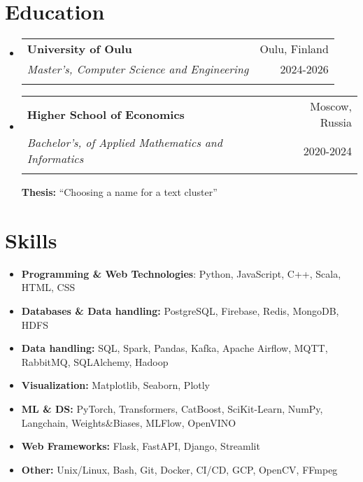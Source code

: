 \documentclass[letterpaper,10pt,dvipsnames]{article}
\makeatletter
\newcommand{\resumeEduSubheading}[5]{
  \item
    \vspace{2pt}\begin{tabular*}{0.97\textwidth}{l@{\extracolsep{\fill}}r}
      \large\textbf{#1} & #2 \\
      \textit{#3} & #4\\\\
    \end{tabular*}\vspace{-7pt}
}
\newcommand{\resumeSubHeadingListStart}{\begin{itemize}[leftmargin=*]}
\newcommand{\resumeSubHeadingListEnd}{\end{itemize}}
\newcommand{\resumeDesc}[1]{\begin{adjustwidth}{5pt}{0pt}\vspace{-2pt}{\small{#1}}\end{adjustwidth}}
\makeatother
\begin{document}
\section{Education}
\resumeSubHeadingListStart
  \resumeEduSubheading
       {University of Oulu}{Oulu, Finland}
      {Master's, Computer Science and Engineering}{2024-2026}
      \resumeDesc{
        \vspace{7pt}
      }
	 
    \resumeEduSubheading
       {Higher School of Economics}{Moscow, Russia}
      {Bachelor's, of Applied Mathematics and Informatics}{2020-2024}
     
    \resumeDesc{
  	\textbf{Thesis:} ``Choosing a name for a text cluster''
    }

      
      
\resumeSubHeadingListEnd

  
      


\section{Skills}
 \resumeSubHeadingListStart
    \item {
        \textbf{Programming \& Web Technologies}: Python, JavaScript, C++, Scala, HTML, CSS
    }
   \vspace{-7pt}
   \item{
     \textbf{Databases \& Data handling: }{PostgreSQL, Firebase, Redis, MongoDB, HDFS}
   }
   \vspace{-7pt}
   \item{
     \textbf{Data handling: }{SQL, Spark, Pandas, Kafka, Apache Airflow, MQTT, RabbitMQ, SQLAlchemy, Hadoop}
   }
   
   \vspace{-7pt}
   \item{
     \textbf{Visualization: }{Matplotlib, Seaborn, Plotly}
   }
   \vspace{-7pt}
   \item{
     \textbf{ML \& DS: }{PyTorch, Transformers, CatBoost, SciKit-Learn, NumPy, Langchain, Weights\&Biases, MLFlow, OpenVINO}
   }
   \vspace{-7pt}
   \item{
     \textbf{Web Frameworks: }{Flask, FastAPI, Django, Streamlit}
   }
   \vspace{-7pt}
   \item{
     \textbf{Other: }{Unix/Linux, Bash, Git, Docker, CI/CD, GCP, OpenCV, FFmpeg}
   }
   \vspace{-7pt}
 \resumeSubHeadingListEnd


\end{document}
